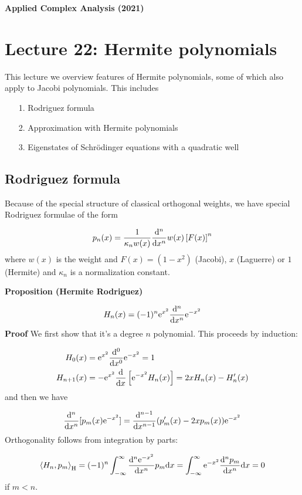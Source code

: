 \documentclass[12pt,landscape]{article}
\def\D{ {\rm d} }
\def\E{ {\rm e} }
\def\ip<#1>{\left\langle{#1}\right\rangle}
\def\dx{\D x}
\begin{document}
{\LARGE
\sf
\textbf{Applied Complex Analysis (2021)}

\section{Lecture 22: Hermite polynomials}
This lecture we overview features of Hermite polynomials, some of which also apply to Jacobi polynomials.  This includes

\begin{itemize}
\item[1. ] Rodriguez formula


\item[2. ] Approximation with Hermite polynomials


\item[3. ] Eigenstates of Schrödinger equations with a quadratic well

\end{itemize}
\newpage
\subsection{Rodriguez formula}
Because of the special structure of classical orthogonal weights, we have special Rodriguez formulae of the form

\[
 p_n(x) = {1 \over \kappa_n w(x)} {\D^n \over \dx^n} w(x) \left[F(x)\right]^n
\]
where $w(x)$ is the weight and $F(x) = (1-x^2)$ (Jacobi), $x$ (Laguerre) or $1$ (Hermite) and $\kappa_n$ is a normalization constant.

\textbf{Proposition (Hermite Rodriguez)}

\[
H_n(x)= (-1)^n \E^{x^2}  {\D^n \over \dx^n} \E^{-x^2}
\]
\newpage
\textbf{Proof} We first show that it's a degree $n$ polynomial. This proceeds by induction:


\begin{align*}
 H_0(x) &= \E^{x^2} {\D^0 \over \dx^0}\E^{-x^2} = 1 \\
 H_{n+1}(x) &= -\E^{x^2}{\D \over \dx}\left[\E^{-x^2} H_{n}(x)\right] =   2x H_{n}(x) - H_n'(x)
\end{align*}
and  then we have

\[
 {\D^n \over \dx^n}[p_m(x) \E^{-x^2}]=  {\D^{n-1} \over \dx^{n-1}}  (p_m'(x)-2x p_m(x))  \E^{-x^2}
\]
Orthogonality follows from integration by parts:

\[
\ip<H_n, p_m>_{\rm H} = (-1)^n \int_{-\infty}^{\infty}  {\D^n  \E^{-x^2} \over \dx^n} p_m \dx = \int_{-\infty}^{\infty}  \E^{-x^2} {\D^n p_m \over \dx^n} \dx = 0
\]
if $m < n$.

}
\end{document}
